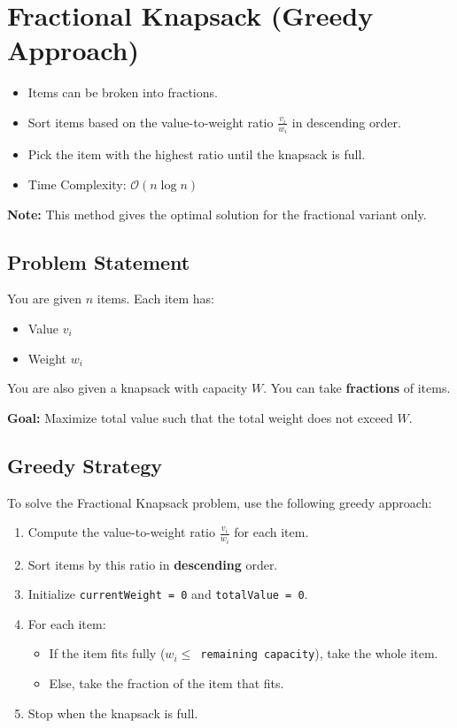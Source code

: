 \documentclass[14pt]{extarticle}
\begin{document}
\section{Fractional Knapsack (Greedy Approach)}

\begin{itemize}[label=\textbullet]
    \item Items can be broken into fractions.
    \item Sort items based on the value-to-weight ratio $\frac{v_i}{w_i}$ in descending order.
    \item Pick the item with the highest ratio until the knapsack is full.
    \item Time Complexity: $\mathcal{O}(n \log n)$
\end{itemize}

\textbf{Note:} This method gives the optimal solution for the fractional variant only.
\subsection{Problem Statement}

You are given $n$ items. Each item has:

\begin{itemize}[label=\textbullet]
    \item Value $v_i$
    \item Weight $w_i$
\end{itemize}

You are also given a knapsack with capacity $W$. You can take \textbf{fractions} of items.

\textbf{Goal:} Maximize total value such that the total weight does not exceed $W$.
\subsection{Greedy Strategy}

To solve the Fractional Knapsack problem, use the following greedy approach:

\begin{enumerate}
    \item Compute the value-to-weight ratio $\frac{v_i}{w_i}$ for each item.
    \item Sort items by this ratio in \textbf{descending} order.
    \item Initialize \texttt{currentWeight = 0} and \texttt{totalValue = 0}.
    \item For each item:
    \begin{itemize}
        \item If the item fits fully (\texttt{$w_i \leq$ remaining capacity}), take the whole item.
        \item Else, take the fraction of the item that fits.
    \end{itemize}
    \item Stop when the knapsack is full.
\end{enumerate}
\end{document}
